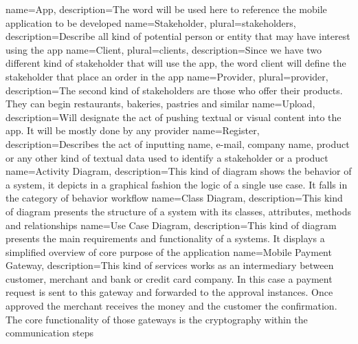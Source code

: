 
\makeglossaries


 {
    name={App},
    description={The word will be used here to reference the mobile application to be developed}
}
 {
    name={Stakeholder},
    plural={stakeholders},
    description={Describe all kind of potential person or entity that may have interest using the app}
}
 {
    name={Client},
    plural={clients},
    description={Since we have two different kind of stakeholder that will use the app, the word
                 client will define the stakeholder that place an order in the app}
}
 {
    name={Provider},
    plural={provider},
    description={The second kind of stakeholders are those who offer their products. They can begin
                restaurants, bakeries, pastries and similar}
}
 {
    name={Upload},
    description={Will designate the act of pushing textual or visual content into the app. It will
                be mostly done by any provider}
}
 {
    name={Register},
    description={Describes the act of inputting name, e-mail, company name, product or any other kind of
    textual data used to identify a stakeholder or a product}
}
 {
    name={Activity Diagram},
    description={This kind of diagram shows the behavior of a system, it depicts in a graphical fashion 
    the logic of a single use case. It falls in the category of behavior workflow \cite{refinbook:Baresi2009}}
}
 {
    name={Class Diagram},
    description={This kind of diagram presents the structure of a system with its classes, attributes,
    methods and relationships\cite{refonline:IBMCD}}
}
 {
    name={Use Case Diagram},
    description={This kind of diagram presents the main requirements and functionality of a systems. It displays
    a simplified overview of core purpose of the application \cite{refart:YWRUS}}
}
 {
    name={Mobile Payment Gateway},
    description={This kind of services works as an intermediary between customer, merchant and bank or credit card company. 
    In this case a payment request is sent to this gateway and forwarded to the approval instances. Once approved the merchant 
    receives the money and the customer the confirmation. The core functionality of those gateways is the cryptography
    within the communication steps\cite{refonline:VPGI}}
}

